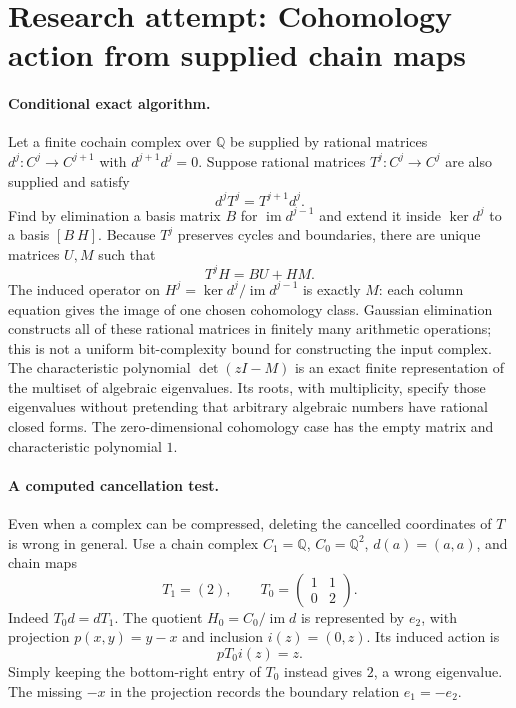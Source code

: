 \documentclass[11pt]{article}
\begin{document}
\section{Research attempt: Cohomology action from supplied chain maps}

\paragraph{Conditional exact algorithm.}
Let a finite cochain complex over $\mathbb Q$ be supplied by rational matrices $d^j:C^j\to C^{j+1}$ with $d^{j+1}d^j=0$. Suppose rational matrices $T^j:C^j\to C^j$ are also supplied and satisfy
\[
 d^jT^j=T^{j+1}d^j.
\]
Find by elimination a basis matrix $B$ for $\operatorname{im}d^{j-1}$ and extend it inside $\ker d^j$ to a basis $[B\ H]$. Because $T^j$ preserves cycles and boundaries, there are unique matrices $U,M$ such that
\[
 T^jH=BU+HM.
\]
The induced operator on $H^j=\ker d^j/\operatorname{im}d^{j-1}$ is exactly $M$: each column equation gives the image of one chosen cohomology class. Gaussian elimination constructs all of these rational matrices in finitely many arithmetic operations; this is not a uniform bit-complexity bound for constructing the input complex. The characteristic polynomial $\det(zI-M)$ is an exact finite representation of the multiset of algebraic eigenvalues. Its roots, with multiplicity, specify those eigenvalues without pretending that arbitrary algebraic numbers have rational closed forms. The zero-dimensional cohomology case has the empty matrix and characteristic polynomial $1$.

\paragraph{A computed cancellation test.}
Even when a complex can be compressed, deleting the cancelled coordinates of $T$ is wrong in general. Use a chain complex $C_1=\mathbb Q$, $C_0=\mathbb Q^2$, $d(a)=(a,a)$, and chain maps
\[
 T_1=(2),\qquad T_0=\begin{pmatrix}1&1\\0&2\end{pmatrix}.
\]
Indeed $T_0d=dT_1$. The quotient $H_0=C_0/\operatorname{im}d$ is represented by $e_2$, with projection $p(x,y)=y-x$ and inclusion $i(z)=(0,z)$. Its induced action is
\[
 pT_0i(z)=z.
\]
Simply keeping the bottom-right entry of $T_0$ instead gives $2$, a wrong eigenvalue. The missing $-x$ in the projection records the boundary relation $e_1=-e_2$.
\end{document}
